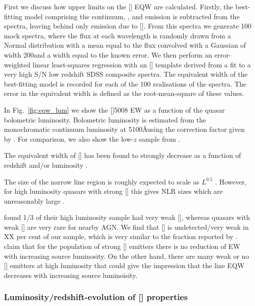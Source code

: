 First we discuss how upper limits on the [] \ac{EQW} are calculated.
Firstly, the best-fitting model comprising the continuum, , and \hb emission is subtracted from the spectra, leaving behind only emission due to []. 
From this spectra we generate 100 mock spectra, where the flux at each wavelength is randomly drawn from a Normal distribution with a mean equal to the flux convolved with a Gaussian of width 200\kms and a width equal to the known error. 
We then perform an error-weighted linear least-squares regression with an [] template derived from a fit to a very high \ac{S/N} low redshift SDSS composite spectra. 
The equivalent width of the best-fitting model is recorded for each of the 100 realisations of the spectra. 
The error in the equivalent width is defined as the root-mean-square of these values.

In Fig.~\ref{fig:eqw_lum} we show the []5008 EW as a function of the quasar bolometric luminosity. 
Bolometric luminosity is estimated from the monochromatic continuum luminosity at 5100\AA using the correction factor given by \citet{richards06}. 
For comparison, we also show the low-$z$ sample from \citet{shen11}.  

The equivalent width of [] has been found to strongly decrease as a function of redshift and/or luminosity \citep[e.g.][]{brotherton96,netzer04,sulentic04,baskin05b}. 

The size of the narrow line region is roughly expected to scale as $L^{0.5}$ \citep[e.g.][]{netzer04}. 
However, for high luminosity quasars with strong [] this gives \ac{NLR} sizes which are unreasonably large \citep[$\sim$100 kpc;][]{netzer04}. 

\citet{netzer04} found 1/3 of their high luminosity sample had very weak [], whereas quasars with weak [] are very rare for nearby \ac{AGN}. 
We find that [] is undetected/very weak in XX per cent of our sample, which is very similar to the fraction reported by \citet{netzer04}.  
\citet{netzer04} claim that for the population of strong [] emitters there is no reduction of EW with increasing source luminosity. 
On the other hand, there are many weak or no [] emitters at high luminosity that could give the impression that the line \ac{EQW} decreases with increasing source luminoisity. 


\subsubsection{Luminosity/redshift-evolution of [] properties}

